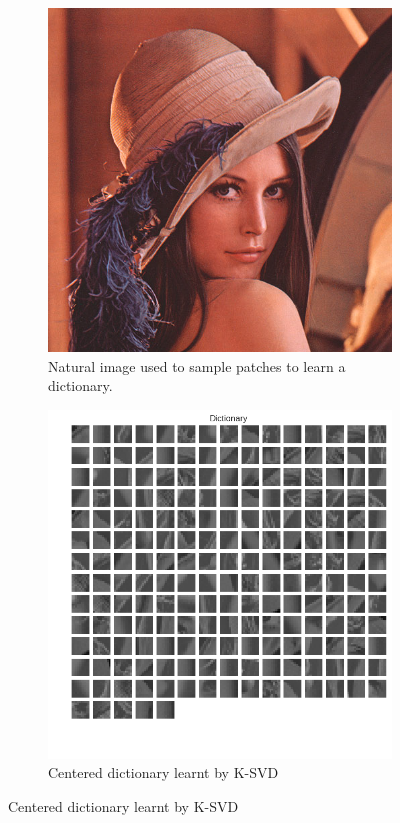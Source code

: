 \documentclass[a4paper,11pt]{article}
\begin{document}
\begin{figure}[!htbp]
\centering
  \begin{subfigure}[b]{.35\linewidth}
    \includegraphics[width=\linewidth]{lena.png}
    \caption{Natural image used to sample patches to learn a dictionary.}
  \end{subfigure}
  \begin{subfigure}[b]{.6\linewidth}
    \includegraphics[width=\linewidth]{dict_lena.png}
    \caption{Centered dictionary learnt by K-SVD}
  \end{subfigure}
  \label{dict_lena}
\end{figure}
\end{document}

